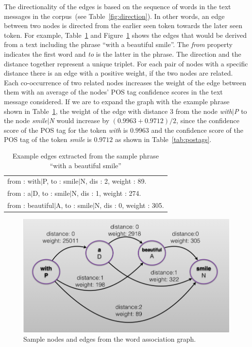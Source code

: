 \documentclass[a4paper,onesided,12pt]{report}
\begin{document}
The directionality of the edges is based  on the sequence of words in the text messages in the corpus~(see Table~\ref{fig:direction}). In other words, an edge between two nodes is directed from the earlier seen token towards the later seen token. For example, Table~\ref{tab:edges} and Figure~\ref{fig:edges} shows the edges that would be derived from a text including the phrase ``with a beautiful smile''. The \textit{from} property indicates the first word and \textit{to} is the latter in the phrase. The direction and the distance together represent a unique triplet. For each pair of nodes with a specific distance there is an edge with a positive weight, if the two nodes are related. Each co-occurrence of two related nodes increases the weight of the edge between them with an average of the nodes' POS tag confidence scores in the text message considered. If we are to expand the graph with the example phrase shown in Table~\ref{tab:edges}, the weight of the edge with distance $3$ from the node \emph{with$|$P}  to the node  \emph{smile$|$N} would increase by $(0.9963+0.9712)/2$, since the confidence score of the POS tag for the token \emph{with} is  $0.9963$ and the confidence score of the POS tag of the token \emph{smile} is $0.9712$ as shown in Table~\ref{tab:postags}.

\begin{table}[hbt]
  \caption{Example edges extracted from the sample phrase  ``with a beautiful smile''}
  \centering
  \begin{tabular}[tc]{l}
 from : with$|$P, to : smile$|$N, dis : 2, weight : 89. \\
 from : a$|$D, to : smile$|$N, dis : 1, weight : 274. \\
 from : beautiful$|$A, to : smile$|$N, dis : 0, weight : 305. \\
\end{tabular}
\label{tab:edges}
\end{table}

\begin{figure}[htb]
\begin{center}
\includegraphics[scale=0.5]{fig/edges}
\caption{Sample nodes and edges from the word association graph.}
\label{fig:edges}
\end{center}
\end{figure}
\end{document}
